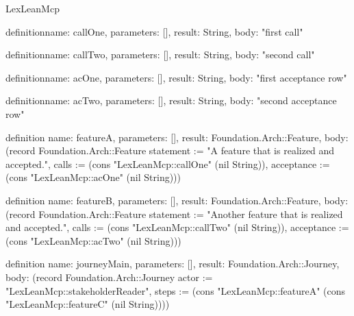 \begin{lexlean}{LexLeanMcp}
\begin{semanticmodule}
definition{name: callOne, parameters: [], result: String, body: "first call"}

definition{name: callTwo, parameters: [], result: String, body: "second call"}

definition{name: acOne, parameters: [], result: String, body: "first acceptance row"}

definition{name: acTwo, parameters: [], result: String, body: "second acceptance row"}

definition{
  name: featureA,
  parameters: [],
  result: Foundation.Arch::Feature,
  body: (record Foundation.Arch::Feature {statement := "A feature that is realized and accepted.", calls := (cons "LexLeanMcp::callOne" (nil String)), acceptance := (cons "LexLeanMcp::acOne" (nil String))})
}

definition{
  name: featureB,
  parameters: [],
  result: Foundation.Arch::Feature,
  body: (record Foundation.Arch::Feature {statement := "Another feature that is realized and accepted.", calls := (cons "LexLeanMcp::callTwo" (nil String)), acceptance := (cons "LexLeanMcp::acTwo" (nil String))})
}

definition{
  name: journeyMain,
  parameters: [],
  result: Foundation.Arch::Journey,
  body: (record Foundation.Arch::Journey {actor := "LexLeanMcp::stakeholderReader", steps := (cons "LexLeanMcp::featureA" (cons "LexLeanMcp::featureC" (nil String)))})
}
\end{semanticmodule}
\end{lexlean}
